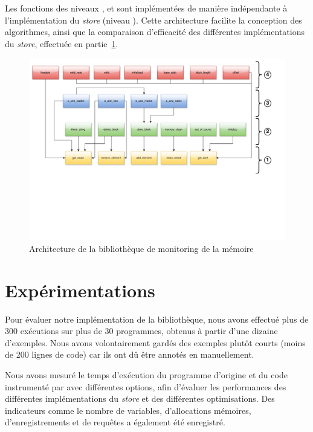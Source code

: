 Les fonctions des niveaux ,  et  sont
implémentées de manière indépendante à l'implémentation du {\em store} (niveau
).
Cette architecture facilite la conception des algorithmes, ainsi que la
comparaison d'efficacité des différentes implémentations du {\em store},
effectuée en partie~\ref{sec:eacsl-exp}.


\begin{landscape}
  \begin{figure}
    \includegraphics[scale=.55]{figures/mmodel_architecture.pdf}
    \vspace{-2.5cm}
    \caption{Architecture de la bibliothèque de monitoring de la mémoire
      \label{fig:mmodel-architecture}}
  \end{figure}
\end{landscape}


\section{Expérimentations}
\label{sec:eacsl-exp}


Pour évaluer notre implémentation de la bibliothèque, nous avons effectué plus
de 300 exécutions sur plus de 30 programmes, obtenus à partir d'une dizaine
d'exemples.
Nous avons volontairement gardés des exemples plutôt courts (moins de 200 lignes
de code) car ils ont dû être annotés en \eacsl manuellement.

Nous avons mesuré le temps d'exécution du programme d'origine et du code
instrumenté par \eacsltoc avec différentes options, afin d'évaluer les
performances des différentes implémentations du {\em store} et des différentes
optimisations.
Des indicateurs comme le nombre de variables, d'allocations mémoires,
d'enregistrements et de requêtes a également été enregistré.


